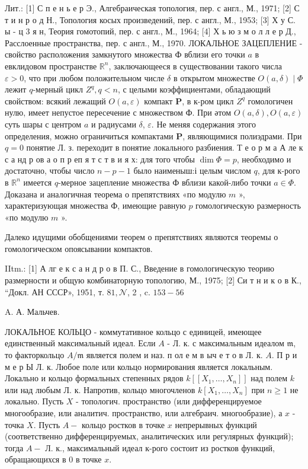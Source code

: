 \documentclass[10pt]{article}
\begin{document}
Лит.: [1] С п е н ь е р Э., Алгебраическая топология, пер. с англ., М., 1971; [2] С т и н р о д Н., Топология косых произведений, пер. с англ., М., 1953; [3] Х у С. ы - ц 3 я н, Теория гомотопий, пер. с англ., М., 1964; [4] Х ь ю з м о л л е р Д., Расслоенные пространства, пер. с англ., М., 1970. ЛОКАЛЬНОЕ ЗАЦЕПЛЕНИЕ - свойство расположения замкнутого множества Ф вблизи его точки $a$ в евклидовом пространстве $\mathbb{R}^{n}$, заключающееся в существовании такого числа $\varepsilon>0$, что при любом положительном числе $\delta$ в открытом множестве $O(a, \delta) \mid \Phi$ лежит $q$-мерный цикл $Z^{q}, q<n$, с целыми коэффициентами, обладающий свойством: всякий лежащий $O(a, \varepsilon)$ компакт $\boldsymbol{P}$, в к-ром цикл $Z^{q}$ гомологичен нулю, имеет непустое пересечение с множеством Ф. При әтом $O(a, \delta), O(a, \varepsilon)$ суть шары с центром $a$ и радиусами $\delta$, $\varepsilon$. Не меняя содержания этого определения, можно ограничиться компактами $\boldsymbol{P}$, являющимися полиэдрами. При $q=0$ понятие Л. з. переходит в понятие локального разбиения. Т е о р м а А ле к с а нд р ов а о п р еп я т с т в и я х: для того чтобы $\operatorname{dim} \Phi=p$, необходимо и достаточно, чтобы число $n-p-1$ было наименыш:і целым числом $q$, для к-рого в $\mathbb{R}^{n}$ имеется $q$-мерное зацепление множества Ф вблизи какой-либо точки $a \in \Phi$. Доказана и аналогичная теорема о препятствиях «по модулю $m$ », характеризующая множества Ф, имеющие равную $p$ гомологическую размерность «по модулю $m$ ».



Далеко идущими обобщениями теорем о препятствиях являются теоремы о гомологическом опоясывании компактов.



IItm.: [1] А лг е к с а н д р о в П. С., Введение в гомологическую теорию размерности и общую комбинаторную топологию, М., 1975; [2] Си т н и к о в К., “Докл. АН СССР», 1951, т. $81, \mathcal{N}$, 2 , c. $153-56$



A. А. Мальчев.



ЛОКАЛЬНОЕ КОЛЬЦО - коммутативное кольцо с единицей, имеющее единственный максимальный идеал. Если $A$ - Л. к. с максимальным идеалом $\mathfrak{m}$, то факторкольцо $A / \mathfrak{m}$ является полем и наз. п ол е м в ыч е т о в Л. к. $A$. П р и м е р Ы Л. к. Любое поле или кольцо нормирования является локальным. Локально и кольцо формальных степенных рядов $k\left[\left[X_{1}, \ldots, X_{n}\right]\right]$ над полем $k$ или над любым Л. к. Напротив, кольцо многочленов $k\left[X_{1}, \ldots, X_{n}\right]$ при $n \geqslant 1$ не локально. Пусть $X$ - топологич. пространство (или дифференцируемое многообразие, или аналитич. пространство, или алгебраич. многообразие), а $x$ - точка $X$. Пусть $A-$ кольцо ростков в точке $x$ непрерывных функций (соответственно дифференцируемых, аналитических или регулярных функций); тогда $A-$ Л. к., максимальный идеал к-рого состоит из ростков функций, обращающихся в 0 в точке $x$.
\end{document}
